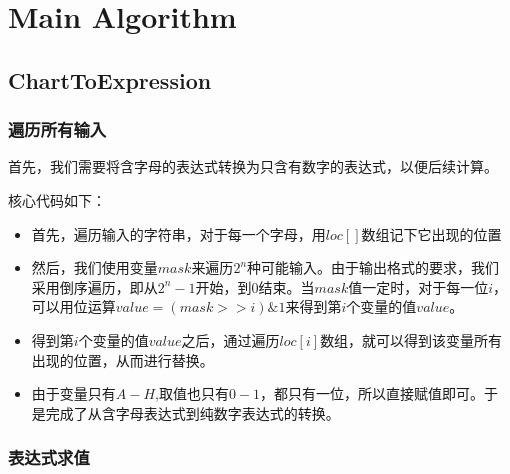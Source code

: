 \section{Main Algorithm}

\subsection{ChartToExpression}
\subsubsection{遍历所有输入}
	首先，我们需要将含字母的表达式转换为只含有数字的表达式，以便后续计算。
	
	核心代码如下：
	
	\begin{itemize}
		\item	首先，遍历输入的字符串，对于每一个字母，用$loc[]$数组记下它出现的位置
		\item	然后，我们使用变量$mask$来遍历$2 ^ n$种可能输入。由于输出格式的要求，我们采用倒序遍历，即从$2^n - 1$开始，到$0$结束。当$mask$值一定时，对于每一位$i$，可以用位运算$value = (mask >> i) \& 1$来得到第$i$个变量的值$value$。
		\item	得到第$i$个变量的值$value$之后，通过遍历$loc[i]$数组，就可以得到该变量所有出现的位置，从而进行替换。
		\item	由于变量只有$A - H$,取值也只有$0 - 1$，都只有一位，所以直接赋值即可。于是完成了从含字母表达式到纯数字表达式的转换。
	\end{itemize}
\subsubsection{表达式求值}
